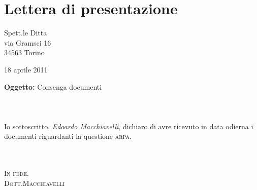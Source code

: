 \documentclass[a4paper,10pt]{article}
\begin{document}
\section{Lettera di presentazione}
Spett.le Ditta\\
via Gramsci 16\\
34563 Torino\\
\begin{flushright}
 18 aprile 2011
\end{flushright}
\textbf{Oggetto:} Consenga documenti
\\
\\
\\
\\
Io sottoscritto, \textit{Edoardo Macchiavelli}, dichiaro di avre ricevuto in data odierna i documenti riguardanti la questione \textsc{arpa}.
\\
\\
\\
\begin{center}
 \textsc{In fede.}\\
\textsc{Dott.Macchiavelli}
\end{center}
\end{document}
